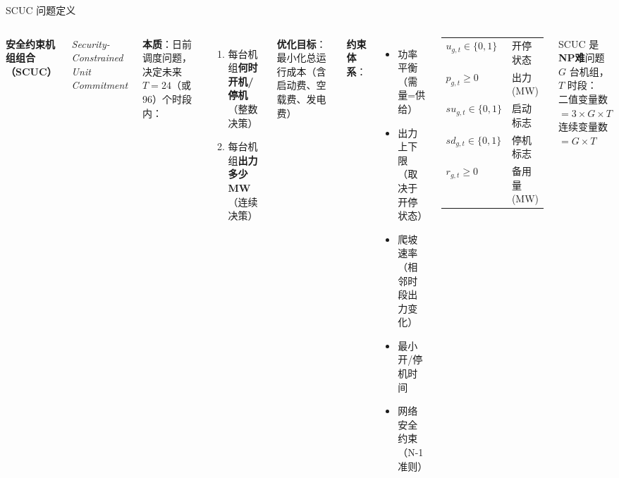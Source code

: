 \documentclass[10pt,aspectratio=169]{beamer}
\begin{document}
\begin{frame}{SCUC 问题定义}
  \begin{columns}[T]
    \textbf{安全约束机组组合（SCUC）}

    \vspace{4pt}
    \textit{Security-Constrained Unit Commitment}

    \vspace{8pt}
    \textbf{本质}：日前调度问题，决定未来 $T=24$（或 96）个时段内：
    \begin{enumerate}
      \item 每台机组\textbf{何时开机/停机}（整数决策）
      \item 每台机组\textbf{出力多少 MW}（连续决策）
    \end{enumerate}

    \vspace{8pt}
    \textbf{优化目标}：最小化总运行成本（含启动费、空载费、发电费）

    \vspace{8pt}
    \textbf{约束体系}：
    \begin{itemize}
      \item 功率平衡（需量=供给）
      \item 出力上下限（取决于开停状态）
      \item 爬坡速率（相邻时段出力变化）
      \item 最小开/停机时间
      \item 网络安全约束（N-1 准则）
    \end{itemize}

    \begin{tcolorbox}[mybox,title=决策变量集合]
      \footnotesize
      \begin{tabular}{@{}ll@{}}
        $u_{g,t}\in\{0,1\}$   & 开停状态 \\[3pt]
        $p_{g,t}\ge 0$         & 出力 (MW) \\[3pt]
        $su_{g,t}\in\{0,1\}$  & 启动标志 \\[3pt]
        $sd_{g,t}\in\{0,1\}$  & 停机标志 \\[3pt]
        $r_{g,t}\ge 0$         & 备用量 (MW) \\
      \end{tabular}
    \end{tcolorbox}

    \vspace{8pt}
    \begin{tcolorbox}[colback=red!5,colframe=red!60,title=计算复杂度]
      \footnotesize
      SCUC 是 \textbf{NP难}问题\\
      $G$ 台机组，$T$ 时段：\\
      二值变量数 $= 3 \times G \times T$\\
      连续变量数 $= G \times T$
    \end{tcolorbox}
  \end{columns}
\end{frame}
\end{document}
